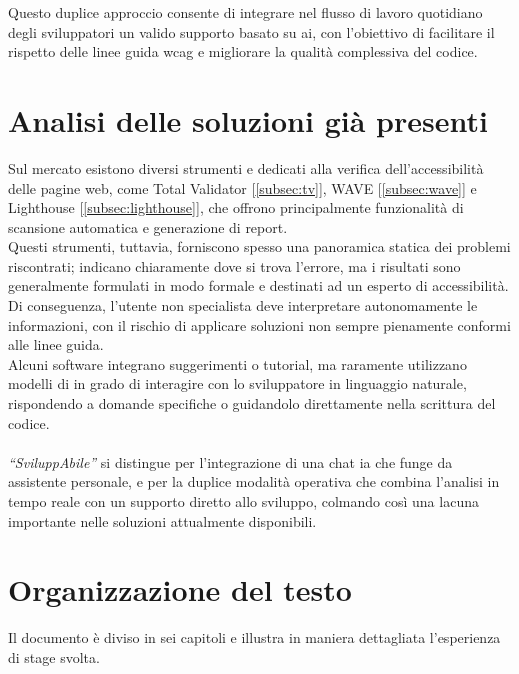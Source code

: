 Questo duplice approccio consente di integrare nel flusso di lavoro quotidiano degli sviluppatori un valido supporto basato su \acrshort{ai}, con l’obiettivo di facilitare il rispetto delle linee guida \acrshort{wcag} e migliorare la qualità complessiva del codice.

\section{Analisi delle soluzioni già presenti}
\noindent Sul mercato esistono diversi strumenti e  dedicati alla verifica dell’accessibilità delle pagine web, come Total Validator [\ref{subsec:tv}], WAVE [\ref{subsec:wave}] e Lighthouse [\ref{subsec:lighthouse}], che offrono principalmente funzionalità di scansione automatica e generazione di report.\\ 
Questi strumenti, tuttavia, forniscono spesso una panoramica statica dei problemi riscontrati; indicano chiaramente dove si trova l’errore, ma i risultati sono generalmente formulati in modo formale e destinati ad un esperto di accessibilità. Di conseguenza, l’utente non specialista deve interpretare autonomamente le informazioni, con il rischio di applicare soluzioni non sempre pienamente conformi alle linee guida.\\ 
Alcuni software integrano suggerimenti o tutorial, ma raramente utilizzano modelli di  in grado di interagire con lo sviluppatore in linguaggio naturale, rispondendo a domande specifiche o guidandolo direttamente nella scrittura del codice. \\
\\
\textit{“SviluppAbile”} si distingue per l’integrazione di una chat \acrshort{ia} che funge da assistente personale, e per la duplice modalità operativa che combina l’analisi in tempo reale con un supporto diretto allo sviluppo, colmando così una lacuna importante nelle soluzioni attualmente disponibili.

\section{Organizzazione del testo}
\noindent Il documento è diviso in sei capitoli e illustra in maniera dettagliata l’esperienza di stage svolta.

